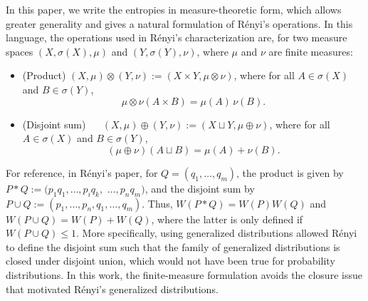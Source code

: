 \documentclass[reqno]{amsart}
\begin{document}
In this paper, we write the entropies in measure-theoretic form, which allows
greater generality and gives a natural formulation of R\'enyi's operations.
In this language, the operations used in R\'enyi's characterization are, for two  measure spaces $(X, \sigma(X), \mu)$ and $(Y,\sigma(Y), \nu)$, where $\mu$ and $\nu$ are finite measures:
\begin{itemize}
    \item (Product) $(X, \mu) \otimes (Y, \nu) := (X \times Y, \mu \otimes \nu)$, where for all $A \in \sigma(X)$ and $B \in \sigma(Y)$, 
    $$
    \mu\otimes \nu(A \times B) = \mu(A) \,\nu(B) .
    $$
    \item (Disjoint sum) ~~ $(X,\mu) \oplus (Y,\nu):= (X \sqcup Y, \mu \oplus \nu)$, where for all $A \in \sigma(X)$ and $B \in \sigma(Y)$, 
    $$
    (\mu \oplus \nu)(A \sqcup B) = \mu(A) + \nu(B).
    $$
\end{itemize}
For reference, in Rényi's paper, for $Q = (q_1, \dots, q_m)$, the product is given by
$P * Q := (p_1 q_1, \dots, p_i q_k,$ $\dots, p_n q_m)$,
and the disjoint sum by
$P \cup Q := (p_1, \dots, p_n, q_1, \dots, q_m)$.
Thus, $W(P*Q) = W(P) W(Q)$ and $W(P \cup Q) = W(P)+W(Q)$, where the latter is only defined if $W(P \cup Q) \leq 1$.
More specifically, using generalized distributions allowed R\'enyi to define the disjoint sum  such that the family of generalized distributions is closed under disjoint union, which would not have been true for probability distributions. In this work, the finite-measure formulation avoids the closure issue that motivated R\'enyi's generalized distributions.
\end{document}
